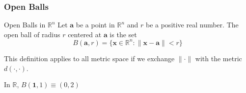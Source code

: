 \documentclass{beamer}
\begin{document}
\begin{frame}
\frametitle{Open Balls}

\begin{block}{Open Balls in $\mathbb{R}^n$}
	Let $\bm{a}$ be a point in $\mathbb{R}^n$ and $r$ be a positive real number. The open ball of radius $r$ centered at $\bm{a}$ is the set 
	$$B(\bm{a}, r) = \{\bm{x} \in \mathbb{R}^n: \|\bm{x} - \bm{a}\| < r\}$$

	This definition applies to all metric space if we exchange $\| \cdot \|$ with the metric $d(\cdot, \cdot)$.
\end{block}

\begin{examples}
	In $\mathbb{R}$, $B(\bm{1}, 1) \equiv (0,2)$
\begin{figure}
\end{figure}
\end{examples}


%
\end{frame}
\end{document}
